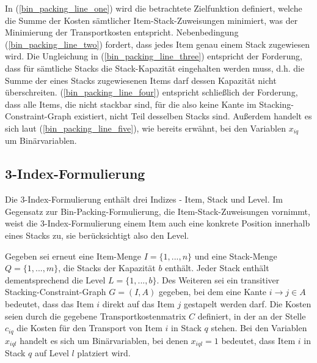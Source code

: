 In (\ref{bin_packing_line_one}) wird die betrachtete Zielfunktion definiert, welche die Summe der Kosten sämtlicher
Item-Stack-Zuweisungen minimiert, was der Minimierung der Transportkosten entspricht.
Nebenbedingung (\ref{bin_packing_line_two}) fordert, dass jedes Item genau einem Stack zugewiesen wird. Die Ungleichung in (\ref{bin_packing_line_three}) entspricht der Forderung, dass für sämtliche Stacks die Stack-Kapazität eingehalten werden muss, d.h.
die Summe der eines Stacks zugewiesenen Items darf dessen Kapazität nicht überschreiten. (\ref{bin_packing_line_four}) entspricht schließlich der Forderung, dass alle Items, die nicht stackbar sind, für die also keine Kante im Stacking-Constraint-Graph existiert, nicht Teil desselben Stacks sind. Außerdem handelt es sich laut (\ref{bin_packing_line_five}), wie bereits erwähnt, bei den Variablen $x_{iq}$ um Binärvariablen.

\subsection{3-Index-Formulierung}
\label{sec:three_idx_formulation}

Die 3-Index-Formulierung enthält drei Indizes - Item, Stack und Level.
Im Gegensatz zur Bin-Packing-Formulierung, die Item-Stack-Zuweisungen vornimmt, weist die 3-Index-Formulierung einem
Item auch eine konkrete Position innerhalb eines Stacks zu, sie berücksichtigt also den Level.

Gegeben sei erneut eine Item-Menge $I = \{1, ..., n\}$ und eine Stack-Menge $Q = \{1, ..., m\}$, die Stacks der Kapazität $b$ enthält.
Jeder Stack enthält dementsprechend die Level $L = \{1, ..., b\}$. Des Weiteren sei ein transitiver Stacking-Constraint-Graph
$G = (I, A)$ gegeben, bei dem eine Kante $i \rightarrow j \in A$ bedeutet, dass das Item $i$ direkt auf das Item $j$ gestapelt werden darf.
Die Kosten seien durch die gegebene Transportkostenmatrix $C$ definiert, in der an der Stelle $c_{iq}$ die Kosten für den
Transport von Item $i$ in Stack $q$ stehen. Bei den Variablen $x_{iql}$ handelt es sich um Binärvariablen,
bei denen $x_{iql} = 1$ bedeutet, dass Item $i$ in Stack $q$ auf Level $l$ platziert wird.

